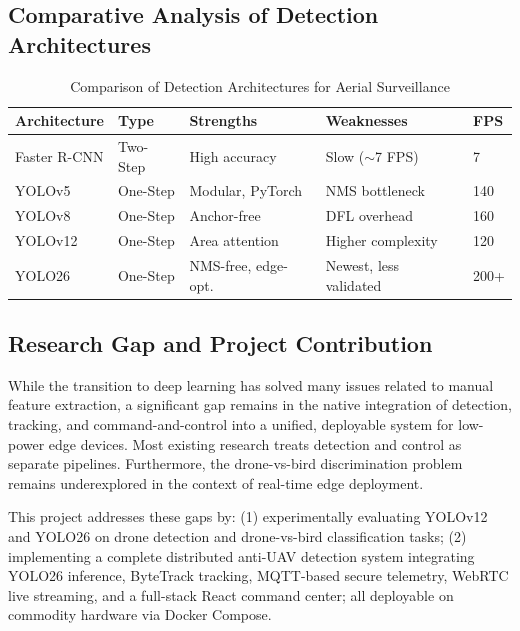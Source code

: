 \documentclass[12pt,a4paper]{report}
\begin{document}
\subsection{Comparative Analysis of Detection Architectures}

\begin{table}[H]
\centering
\caption{Comparison of Detection Architectures for Aerial Surveillance}
\label{tab:arch_comparison}
\begin{tabular}{@{}lllll@{}}
\toprule
\textbf{Architecture} & \textbf{Type} & \textbf{Strengths} & \textbf{Weaknesses} & \textbf{FPS} \\
\midrule
Faster R-CNN & Two-Step & High accuracy & Slow ($\sim$7 FPS) & 7 \\
YOLOv5 & One-Step & Modular, PyTorch & NMS bottleneck & 140 \\
YOLOv8 & One-Step & Anchor-free & DFL overhead & 160 \\
YOLOv12 & One-Step & Area attention & Higher complexity & 120 \\
YOLO26 & One-Step & NMS-free, edge-opt. & Newest, less validated & 200+ \\
\bottomrule
\end{tabular}
\end{table}

\subsection{Research Gap and Project Contribution}

While the transition to deep learning has solved many issues related to manual
feature extraction, a significant gap remains in the native integration of
detection, tracking, and command-and-control into a unified, deployable system
for low-power edge devices. Most existing research treats detection and control
as separate pipelines. Furthermore, the drone-vs-bird discrimination problem
remains underexplored in the context of real-time edge deployment.

This project addresses these gaps by: (1) experimentally evaluating YOLOv12 and
YOLO26 on drone detection and drone-vs-bird classification tasks; (2) implementing
a complete distributed anti-UAV detection system integrating YOLO26 inference,
ByteTrack tracking, MQTT-based secure telemetry, WebRTC live streaming, and a
full-stack React command center; all deployable on commodity hardware via Docker
Compose.

\end{document}
